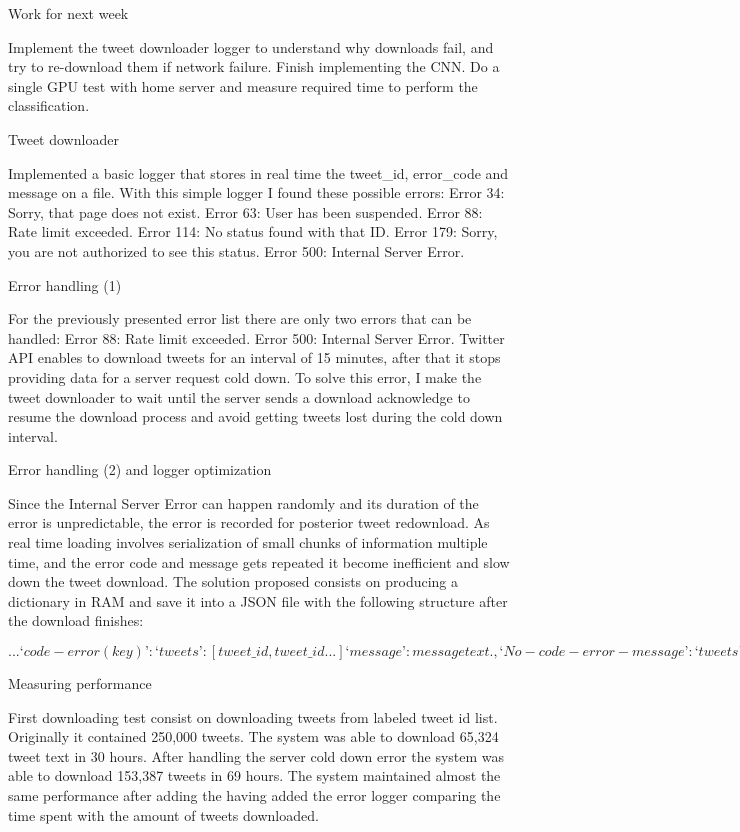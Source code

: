 Work for next week

Implement the tweet downloader logger to understand why downloads fail, and try to re-download them if network failure.
Finish implementing the CNN.
Do a single GPU test with home server and measure required time to perform the classification.

Tweet downloader

Implemented a basic logger that stores in real time the tweet\_id, error\_code and message on a file. With this simple logger I found these possible errors:
Error 34: Sorry, that page does not exist.
Error 63: User has been suspended.
Error 88: Rate limit exceeded.
Error 114: No status found with that ID.
Error 179: Sorry, you are not authorized to see this status.
Error 500: Internal Server Error.

Error handling (1)

For the previously presented error list there are only two errors that can be handled:
Error 88: Rate limit exceeded.
Error 500: Internal Server Error.
Twitter API enables to download tweets for an interval of 15 minutes, after that it stops providing data for a server request cold down. To solve this error, I make the tweet downloader to wait until the server sends a download acknowledge to resume the download process and avoid getting tweets lost during the cold down interval.

Error handling (2) and logger optimization

Since the Internal Server Error can happen randomly and its duration of the error is unpredictable, the error is recorded for posterior tweet redownload.
As real time loading involves serialization of small chunks of information multiple time, and the error code and message gets repeated it become inefficient and slow down the tweet download. The solution proposed consists on producing a dictionary in RAM and save it into a JSON file with the following structure after the download finishes:

$...
‘code-error (key)’: {
‘tweets’: [
	tweet\_id,
	tweet\_id
	...
]
‘message’: message text.
},
‘No-code-error-message’: {
	‘tweets’: [
	tweet\_id
]
}
...$

Measuring performance

First downloading test consist on downloading tweets from labeled tweet id list. Originally it contained 250,000 tweets. The system was able to download 65,324 tweet text in 30 hours.
After handling the server cold down error the system was able to download 153,387 tweets in 69 hours.
The system maintained almost the same performance after adding the having added the error logger comparing the time spent with the amount of tweets downloaded.

